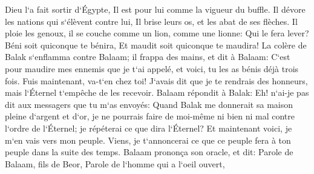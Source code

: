 \verse Dieu l`a fait sortir d`Égypte, Il est pour lui comme la vigueur du buffle. Il dévore les nations qui s`élèvent contre lui, Il brise leurs os, et les abat de ses flèches. 
\verse Il ploie les genoux, il se couche comme un lion, comme une lionne: Qui le fera lever? Béni soit quiconque te bénira, Et maudit soit quiconque te maudira! 
\verse La colère de Balak s`enflamma contre Balaam; il frappa des mains, et dit à Balaam: C`est pour maudire mes ennemis que je t`ai appelé, et voici, tu les as bénis déjà trois fois. 
\verse Fuis maintenant, va-t`en chez toi! J`avais dit que je te rendrais des honneurs, mais l`Éternel t`empêche de les recevoir. 
\verse Balaam répondit à Balak: Eh! n`ai-je pas dit aux messagers que tu m`as envoyés: 
\verse Quand Balak me donnerait sa maison pleine d`argent et d`or, je ne pourrais faire de moi-même ni bien ni mal contre l`ordre de l`Éternel; je répéterai ce que dira l`Éternel? 
\verse Et maintenant voici, je m`en vais vers mon peuple. Viens, je t`annoncerai ce que ce peuple fera à ton peuple dans la suite des temps. 
\verse Balaam prononça son oracle, et dit: Parole de Balaam, fils de Beor, Parole de l`homme qui a l`oeil ouvert, 
